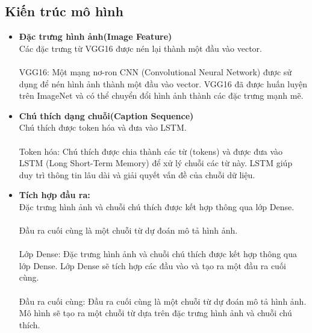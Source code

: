 \documentclass{article}
\begin{document}
\subsection{ Kiến trúc mô hình}
\begin{itemize}

    \item \textbf{Đặc trưng hình ảnh(Image Feature)}
    \\
    Các đặc trưng từ VGG16 được nén lại thành một đầu vào vector.\\
\\
    VGG16: Một mạng nơ-ron CNN (Convolutional Neural Network) được sử dụng để nén hình ảnh thành một đầu vào vector. VGG16 đã được huấn luyện trên ImageNet và có thể chuyển đổi hình ảnh thành các đặc trưng mạnh mẽ.

    \item \textbf{Chú thích dạng chuỗi(Caption Sequence)}
    \\
    Chú thích được token hóa và đưa vào LSTM.\\
    \\
    Token hóa: Chú thích được chia thành các từ (tokens) và được đưa vào LSTM (Long Short-Term Memory) để xử lý chuỗi các từ này. LSTM giúp duy trì thông tin lâu dài và giải quyết vấn đề của chuỗi dữ liệu.\\

    \item \textbf{Tích hợp đầu ra:}
    \\
    Đặc trưng hình ảnh và chuỗi chú thích được kết hợp thông qua lớp Dense.\\
\\
    Đầu ra cuối cùng là một chuỗi từ dự đoán mô tả hình ảnh.\\
    \\
    Lớp Dense: Đặc trưng hình ảnh và chuỗi chú thích được kết hợp thông qua lớp Dense. Lớp Dense sẽ tích hợp các đầu vào và tạo ra một đầu ra cuối cùng.\\
    \\
    Đầu ra cuối cùng: Đầu ra cuối cùng là một chuỗi từ dự đoán mô tả hình ảnh. Mô hình sẽ tạo ra một chuỗi từ dựa trên đặc trưng hình ảnh và chuỗi chú thích.\\
    \\
\end{itemize}
\end{document}
